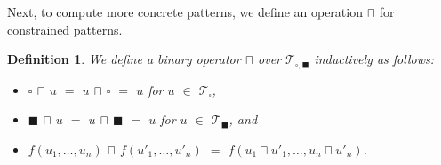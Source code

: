 \documentclass[copyright,creativecommons]{eptcs}
\newtheorem{definition}{Definition}
\newcommand{\Terms}{{\mathcal{T}}}
\begin{document}
Next, to compute more concrete patterns, we define an operation $\sqcap$
for constrained patterns.
\begin{definition}
We define a binary operator $\sqcap$ over
 $\Terms_{\square,\blacksquare}$ inductively as follows:
\begin{itemize}
 \item $\square$ $\sqcap$ $u$ $=$ $u$ $\sqcap$ $\square$ $=$ $u$ for $u$
       $\in$ $\Terms_\square$, 
 \item $\blacksquare$ $\sqcap$ $u$ $=$ $u$ $\sqcap$ $\blacksquare$ $=$
       $u$ for $u$ $\in$ $\Terms_\blacksquare$, and
 \item $f(u_1,\ldots,u_n)$ $\sqcap$ $f(u'_1,\ldots,u'_n)$ $=$ $f(u_1
       \sqcap u'_1,\ldots,u_n \sqcap u'_n)$. 
\end{itemize}
\end{definition}
\end{document}

